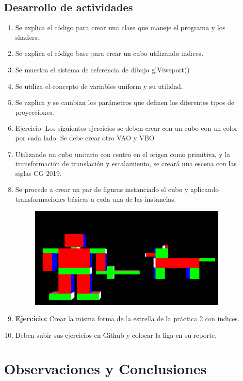 \documentclass[11pt, english]{article}
\begin{document}
\subsection{Desarrollo de actividades}
\begin{enumerate}
\item Se explica el código para crear una clase que maneje el programa y los shaders.
\item Se explica el código base para crear un cubo utilizando indices.
\item Se muestra el sistema de referencia de dibujo glViweport()
\item Se utiliza el concepto de variables uniform y su utilidad.
\item Se explica y se cambian los parámetros que definen los diferentes tipos de
proyecciones.
\item Ejercicio: Los siguientes ejercicios se deben crear con un cubo con un color por cada lado. Se debe crear otro VAO y VBO
\item Utilizando un cubo unitario con centro en el origen como primitiva, y la
transformación de translación y escalamiento, se creará una escena con las siglas CG 2019.
\item Se procede a crear un par de figuras instanciado el cubo y aplicando
transformaciones básicas a cada una de las instancias.
\begin{figure}[htb]
\begin{center}
\includegraphics[width=10cm]{images/Transformaciones.png}
\end{center}
\end{figure}
\item \textbf{Ejercicio:} Crear la misma forma de la estrella de la práctica 2 con indices.
\item Deben subir sus ejercicios en Github y colocar la liga en su reporte.
\end{enumerate}
\section{Observaciones y Conclusiones}
\end{document}
